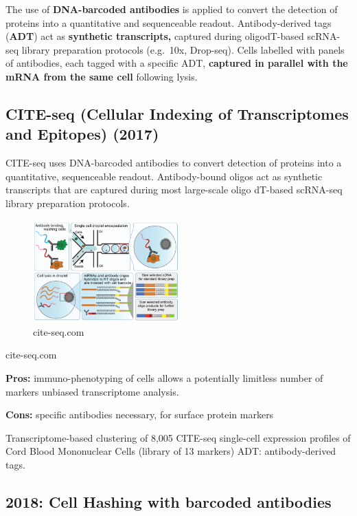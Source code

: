 The use of \textbf{DNA-barcoded antibodies} is applied to convert the
detection of proteins into a quantitative and sequenceable readout.
Antibody-derived tags (\textbf{ADT}) act as \textbf{synthetic
transcripts,} captured during oligodT-based scRNA- seq library
preparation protocols (e.g.~10x, Drop-seq). Cells labelled with panels
of antibodies, each tagged with a specific ADT, \textbf{captured in
parallel with the mRNA from the same cell} following lysis.

\hypertarget{cite-seq-cellular-indexing-of-transcriptomes-and-epitopes-2017}{%
\subsection{CITE-seq (Cellular Indexing of Transcriptomes and Epitopes)
(2017)}\label{cite-seq-cellular-indexing-of-transcriptomes-and-epitopes-2017}}

CITE-seq uses DNA-barcoded antibodies to convert detection of proteins
into a quantitative, sequenceable readout. Antibody-bound oligos act as
synthetic transcripts that are captured during most large-scale oligo
dT-based scRNA-seq library preparation protocols.

\begin{figure}
\centering
\includegraphics[width=0.5\textwidth]{images/Screen_Shot_2023-02-22_at_20-37-02.png}
\caption{cite-seq.com}
\end{figure}

cite-seq.com

\textbf{Pros:} immuno-phenotyping of cells allows a potentially
limitless number of markers unbiased transcriptome analysis.

\textbf{Cons:} specific antibodies necessary, for surface protein
markers

Transcriptome-based clustering of 8,005 CITE-seq single-cell expression
profiles of Cord Blood Mononuclear Cells (library of 13 markers) ADT:
antibody-derived tags.

\hypertarget{cell-hashing-with-barcoded-antibodies}{%
\subsection{2018: Cell Hashing with barcoded
antibodies}\label{cell-hashing-with-barcoded-antibodies}}

